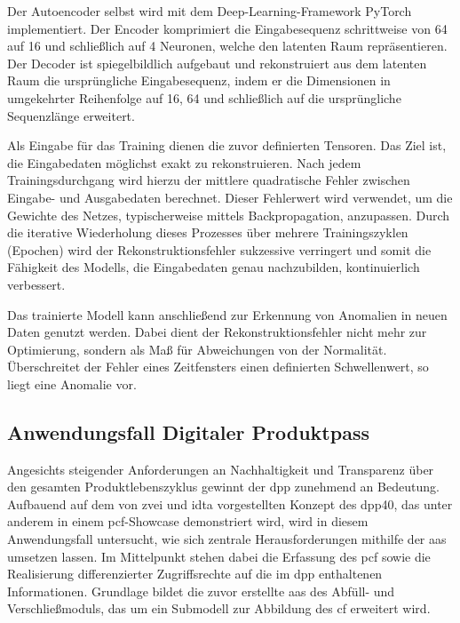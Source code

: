 Der Autoencoder selbst wird mit dem Deep-Learning-Framework PyTorch \cite{PyTorch} implementiert.
Der Encoder komprimiert die Eingabesequenz schrittweise von 64 auf 16 und schließlich auf 4 Neuronen, welche den latenten Raum repräsentieren.
Der Decoder ist spiegelbildlich aufgebaut und rekonstruiert aus dem latenten Raum die ursprüngliche Eingabesequenz, indem er die Dimensionen in umgekehrter Reihenfolge auf 16, 64 und schließlich auf die ursprüngliche Sequenzlänge erweitert.

Als Eingabe für das Training dienen die zuvor definierten Tensoren.
Das Ziel ist, die Eingabedaten möglichst exakt zu rekonstruieren.
Nach jedem Trainingsdurchgang wird hierzu der mittlere quadratische Fehler zwischen Eingabe- und Ausgabedaten berechnet.
Dieser Fehlerwert wird verwendet, um die Gewichte des Netzes, typischerweise mittels Backpropagation, anzupassen.
Durch die iterative Wiederholung dieses Prozesses über mehrere Trainingszyklen (Epochen) wird der Rekonstruktionsfehler sukzessive verringert und somit die Fähigkeit des Modells, die Eingabedaten genau nachzubilden, kontinuierlich verbessert.

Das trainierte Modell kann anschließend zur Erkennung von Anomalien in neuen Daten genutzt werden.
Dabei dient der Rekonstruktionsfehler nicht mehr zur Optimierung, sondern als Maß für Abweichungen von der Normalität.
Überschreitet der Fehler eines Zeitfensters einen definierten Schwellenwert, so liegt eine Anomalie vor.

\newpage
\subsection{Anwendungsfall Digitaler Produktpass}
Angesichts steigender Anforderungen an Nachhaltigkeit und Transparenz über den gesamten Produktlebenszyklus gewinnt der \acs{dpp} zunehmend an Bedeutung.
Aufbauend auf dem von \acs{zvei} und \acs{idta} vorgestellten Konzept des \acs{dpp40}, das unter anderem in einem \acs{pcf}-Showcase \cite{PCFShowcas} demonstriert wird, wird in diesem Anwendungsfall untersucht, wie sich zentrale Herausforderungen mithilfe der \acs{aas} umsetzen lassen.
Im Mittelpunkt stehen dabei die Erfassung des \acs{pcf} sowie die Realisierung differenzierter Zugriffsrechte auf die im \acs{dpp} enthaltenen Informationen.
Grundlage bildet die zuvor erstellte \acs{aas} des Abfüll- und Verschließmoduls, das um ein Submodell zur Abbildung des \acs{cf} erweitert wird.

